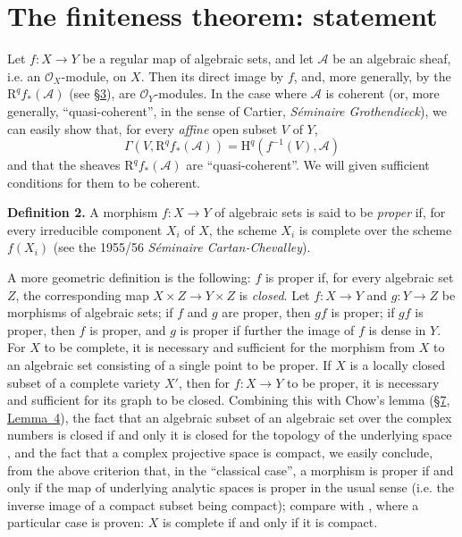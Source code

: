\documentclass{article}
\newenvironment{rmenv}[1]
  {\smallskip\noindent\textbf{#1.}\rmfamily}
  {\smallskip}
\newcommand{\scr}[1]{{\mathscr{#1}}}
\newcommand{\HH}{\mathrm{H}}
\newcommand{\RR}{\mathrm{R}}
\newcommand{\oldpage}[1]{\marginpar{\footnotesize$\Big\vert$ \textit{p.~#1}}}
\begin{document}
\section{The finiteness theorem: statement}
\label{section5}

Let $f\colon X\to Y$ be a regular map of algebraic sets, and let $\scr{A}$ be an algebraic sheaf, i.e. an $\scr{O}_X$-module, on $X$.
Then its direct image by $f$, and, more generally, by the $\RR^qf_*(\scr{A})$ (see \hyperref[section3]{\S3}), are $\scr{O}_Y$-modules.
In the case where $\scr{A}$ is coherent (or, more generally, ``quasi-coherent'', in the sense of Cartier, \emph{S\'{e}minaire Grothendieck}), we can easily show that, for every \emph{affine} open subset $V$ of $Y$,
\[
  \Gamma(V,\RR^qf_*(\scr{A})) = \HH^q(f^{-1}(V),\scr{A})
\]
and that the sheaves $\RR^qf_*(\scr{A})$ are ``quasi-coherent''.
We will given sufficient conditions for them to be coherent.

\begin{rmenv}{Definition 2}
\label{definition2}
  A morphism $f\colon X\to Y$ of algebraic sets is said to be \emph{proper} if, for every irreducible component $X_i$ of $X$, the scheme $X_i$ is complete over the scheme $f(X_i)$ (see the 1955/56 \emph{S\'{e}minaire Cartan-Chevalley}).
\end{rmenv}

A more geometric definition is the following: $f$ is proper if, for every algebraic set $Z$, the corresponding map $X\times Z\to Y\times Z$ is \emph{closed}.
Let $f\colon X\to Y$ and $g\colon Y\to Z$ be morphisms of algebraic sets;
if $f$ and $g$ are proper, then $gf$ is proper;
if $gf$ is proper, then $f$ is proper, and $g$ is proper if further the image of $f$ is dense in $Y$.
For $X$ to be complete, it is necessary and sufficient for the morphism from $X$ to an algebraic set consisting of a single point to be proper.
If $X$ is a locally closed subset of a complete variety $X'$, then for $f\colon X\to Y$ to be proper, it is necessary and sufficient for its graph to be closed.
Combining this with Chow's lemma (\hyperref[section7]{\S7}, \hyperref[lemma4]{Lemma~4}), the fact that an algebraic subset of an algebraic set over the complex numbers is closed if and only it is closed for the topology of the underlying space \cite[proposition~7, page~12]{2}, and the fact that a complex projective space is compact, we easily conclude, from the
\oldpage{2-08}
above criterion that, in the ``classical case'', a morphism is proper if and only if the map of underlying analytic spaces is proper in the usual sense (i.e. the inverse image of a compact subset being compact);
compare with \cite[proposition~12, proposition~6]{2}, where a particular case is proven: $X$ is complete if and only if it is compact.
\end{document}
